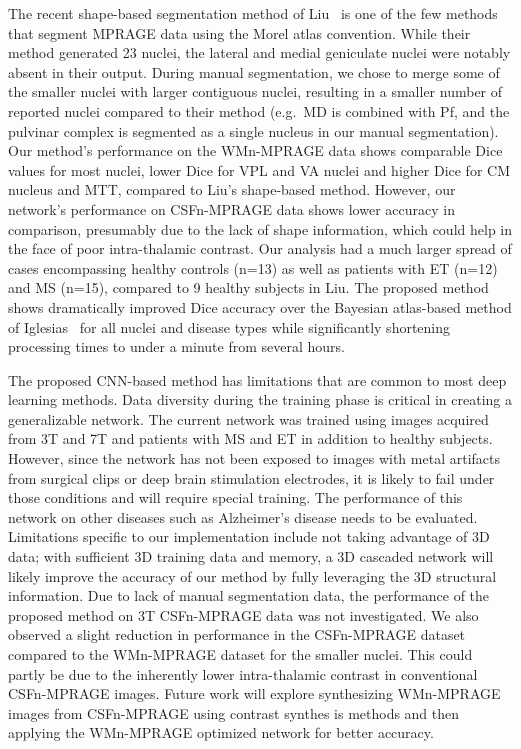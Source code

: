 The recent shape-based segmentation method of Liu~\cite{liu_Generation_2020} is one of the few methods that segment MPRAGE data using the Morel atlas convention. While their method generated 23 nuclei, the lateral and medial geniculate nuclei were notably absent in their output. During manual segmentation, we chose to merge some of the smaller nuclei with larger contiguous nuclei, resulting in a smaller number of reported nuclei compared to their method (e.g.\ MD is combined with Pf, and the pulvinar complex is segmented as a single nucleus in our manual segmentation). Our method's performance on the WMn-MPRAGE data shows comparable Dice values for most nuclei, lower Dice for VPL and VA nuclei and higher Dice for CM nucleus and MTT, compared to Liu's shape-based method. However, our network's performance on CSFn-MPRAGE data shows lower accuracy in comparison, presumably due to the lack of shape information, which could help in the face of poor intra-thalamic contrast. Our analysis had a much larger spread of cases encompassing healthy controls (n=13) as well as patients with ET (n=12) and MS (n=15), compared to 9 healthy subjects in Liu. The proposed method shows dramatically improved Dice accuracy over the Bayesian atlas-based method of Iglesias~\cite{iglesias_Probabilistic_2018} for all nuclei and disease types while significantly shortening processing times to under a minute from several hours.

The proposed CNN-based method has limitations that are common to most deep learning methods. Data diversity during the training phase is critical in creating a generalizable network. The current network was trained using images acquired from 3T and 7T and patients with MS and ET in addition to healthy subjects. However, since the network has not been exposed to images with metal artifacts from surgical clips or deep brain stimulation electrodes, it is likely to fail under those conditions and will require special training. The performance of this network on other diseases such as Alzheimer's disease needs to be evaluated. Limitations specific to our implementation include not taking advantage of 3D data; with sufficient 3D training data and memory, a 3D cascaded network will likely improve the accuracy of our method by fully leveraging the 3D structural information. Due to lack of manual segmentation data, the performance of the proposed method on 3T CSFn-MPRAGE data was not investigated. We also observed a slight reduction in performance in the CSFn-MPRAGE dataset compared to the WMn-MPRAGE dataset for the smaller nuclei. This could partly be due to the inherently lower intra-thalamic contrast in conventional CSFn-MPRAGE images. Future work will explore synthesizing WMn-MPRAGE images from CSFn-MPRAGE using contrast synthes is methods and then applying the WMn-MPRAGE optimized network for better accuracy.

